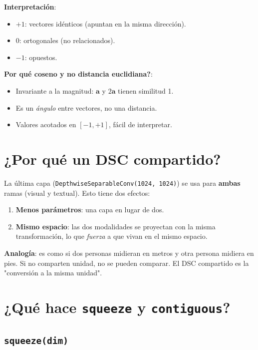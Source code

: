 \noindent\textbf{Interpretación}:
\begin{itemize}
  \item $+1$: vectores idénticos (apuntan en la misma dirección).
  \item $0$: ortogonales (no relacionados).
  \item $-1$: opuestos.
\end{itemize}

\noindent\textbf{Por qué coseno y no distancia euclidiana?}:
\begin{itemize}
  \item Invariante a la magnitud: $\mathbf{a}$ y $2\mathbf{a}$
        tienen similitud 1.
  \item Es un \emph{ángulo} entre vectores, no una distancia.
  \item Valores acotados en $[-1, +1]$, fácil de interpretar.
\end{itemize}

\section{¿Por qué un DSC compartido?}

La última capa (\texttt{DepthwiseSeparableConv(1024, 1024)}) se
usa para \textbf{ambas} ramas (visual y textual). Esto tiene dos
efectos:

\begin{enumerate}
  \item \textbf{Menos parámetros}: una capa en lugar de dos.
  \item \textbf{Mismo espacio}: las dos modalidades se proyectan
        con la misma transformación, lo que \emph{fuerza} a que
        vivan en el mismo espacio.
\end{enumerate}

\noindent\textbf{Analogía}: es como si dos personas midieran en
metros y otra persona midiera en pies. Si no comparten unidad,
no se pueden comparar. El DSC compartido es la "conversión a la
misma unidad".

\section{¿Qué hace \texttt{squeeze} y \texttt{contiguous}?}

\subsection{\texttt{squeeze(dim)}}

